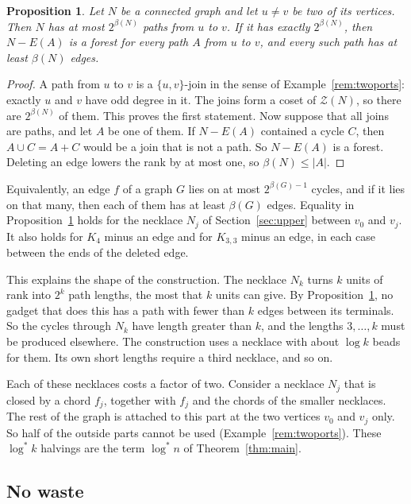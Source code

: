 \documentclass[11pt]{article}
\newtheorem{proposition}[theorem]{Proposition}
\theoremstyle{definition}
\theoremstyle{remark}
\newcommand{\Z}{\mathcal{Z}}
\newcommand{\lgs}{\log^{*}}
\numberwithin{equation}{section}
\begin{document}
\begin{proposition}\label{prop:terminal}
Let $N$ be a connected graph and let $u\ne v$ be two of its vertices. Then $N$ has at most
$2^{\beta(N)}$ paths from $u$ to $v$. If it has exactly $2^{\beta(N)}$, then $N-E(A)$ is a forest
for every path $A$ from $u$ to $v$, and every such path has at least $\beta(N)$ edges.
\end{proposition}

\begin{proof}
A path from $u$ to $v$ is a $\{u,v\}$-join in the sense of Example~\ref{rem:twoports}: exactly $u$
and $v$ have odd degree in it. The joins form a coset of $\Z(N)$, so there are $2^{\beta(N)}$ of
them. This proves the first statement. Now suppose that all joins are paths, and let $A$ be one of
them. If $N-E(A)$ contained a cycle $C$, then $A\cup C=A+C$ would be a join that is not a path. So
$N-E(A)$ is a forest. Deleting an edge lowers the rank by at most one, so $\beta(N)\le|A|$.
\end{proof}

Equivalently, an edge $f$ of a graph $G$ lies on at most $2^{\beta(G)-1}$ cycles, and if it lies on
that many, then each of them has at least $\beta(G)$ edges. Equality in
Proposition~\ref{prop:terminal} holds for the necklace $N_j$ of Section~\ref{sec:upper} between
$v_0$ and $v_j$. It also holds for $K_4$ minus an edge and for $K_{3,3}$ minus an edge, in each case
between the ends of the deleted edge.

This explains the shape of the construction. The necklace $N_k$ turns $k$ units of rank into
$2^{k}$ path lengths, the most that $k$ units can give. By Proposition~\ref{prop:terminal}, no
gadget that does this has a path with fewer than $k$ edges between its terminals. So the cycles
through $N_k$ have length greater than $k$, and the lengths $3,\dots,k$ must be produced elsewhere.
The construction uses a necklace with about $\log k$ beads for them. Its own short lengths require
a third necklace, and so on.

Each of these necklaces costs a factor of two. Consider a necklace $N_j$ that is closed by a chord
$f_j$, together with $f_j$ and the chords of the smaller necklaces. The rest of the graph is
attached to this part at the two vertices $v_0$ and $v_j$ only. So half of the outside parts cannot
be used (Example~\ref{rem:twoports}). These $\lgs k$ halvings are the term $\lgs n$ of
Theorem~\ref{thm:main}.

\subsection{No waste}
\end{document}
